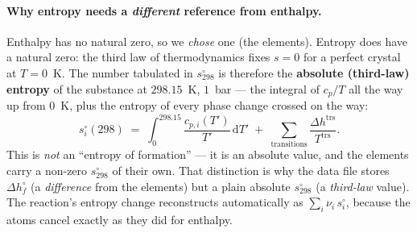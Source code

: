 \documentclass[11pt,a4paper]{article}
\begin{document}
\paragraph{Why entropy needs a \emph{different} reference from enthalpy.}
Enthalpy has no natural zero, so we \emph{chose} one (the elements).
Entropy does have a natural zero: the third law of thermodynamics fixes
$s = 0$ for a perfect crystal at $T = 0$~K.  The number tabulated in
$s^{\circ}_{298}$ is therefore the \textbf{absolute (third-law) entropy}
of the substance at $298.15$~K, $1$~bar --- the integral of $c_p/T$ all
the way up from $0$~K, plus the entropy of every phase change crossed on
the way:
\begin{equation}
   s^{\circ}_{i}(298) \;=\;
   \int_{0}^{298.15} \frac{c_{p,i}(T')}{T'}\,\mathrm{d}T'
   \;+\; \sum_{\text{transitions}} \frac{\Delta h^{\mathrm{trs}}}{T^{\mathrm{trs}}}.
   \label{eq:third-law-entropy}
\end{equation}
This is \emph{not} an ``entropy of formation'' --- it is an absolute
value, and the elements carry a non-zero $s^{\circ}_{298}$ of their own.
That distinction is why the data file stores $\Delta h^{\circ}_{f}$
(a \emph{difference} from the elements) but a plain absolute
$s^{\circ}_{298}$ (a \emph{third-law} value).  The reaction's entropy
change reconstructs automatically as $\sum_i \nu_i\, s^{\circ}_i$,
because the atoms cancel exactly as they did for enthalpy.
\end{document}
